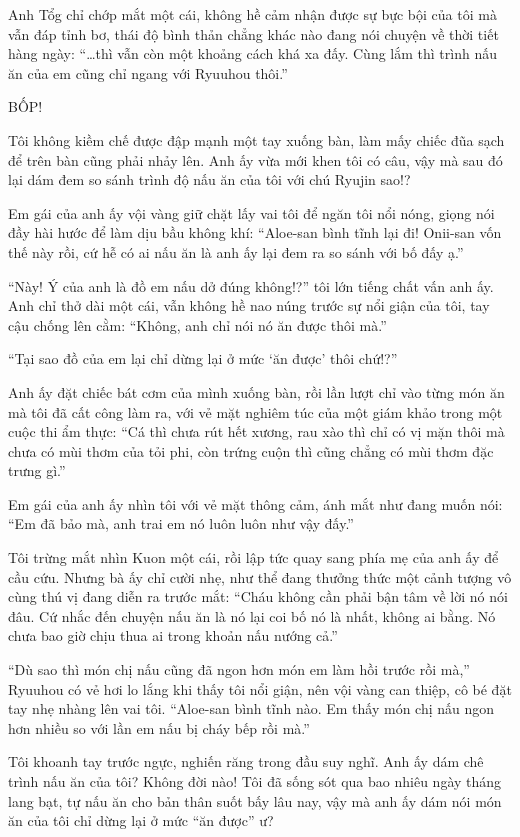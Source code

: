 \documentclass[../main.tex]{subfiles}
\begin{document}
Anh Tổg chỉ chớp mắt một cái, không hề cảm nhận được sự bực bội của tôi mà vẫn đáp tỉnh bơ, thái độ bình thản chẳng khác nào đang nói chuyện về thời tiết hàng ngày: ``\dots thì vẫn còn một khoảng cách khá xa đấy. Cùng lắm thì trình nấu ăn của em cũng chỉ ngang với Ryuuhou thôi.''

BỐP!

Tôi không kiềm chế được đập mạnh một tay xuống bàn, làm mấy chiếc đũa sạch để trên bàn cũng phải nhảy lên. Anh ấy vừa mới khen tôi có câu, vậy mà sau đó lại dám đem so sánh trình độ nấu ăn của tôi với chú Ryujin sao!?

Em gái của anh ấy vội vàng giữ chặt lấy vai tôi để ngăn tôi nổi nóng, giọng nói đầy hài hước để làm dịu bầu không khí: ``Aloe-san bình tĩnh lại đi! Onii-san vốn thế này rồi, cứ hễ có ai nấu ăn là anh ấy lại đem ra so sánh với bố đấy ạ.''

``Này! Ý của anh là đồ em nấu dở đúng không!?'' tôi lớn tiếng chất vấn anh ấy. Anh chỉ thở dài một cái, vẫn không hề nao núng trước sự nổi giận của tôi, tay cậu chống lên cằm: ``Không, anh chỉ nói nó ăn được thôi mà.''

``Tại sao đồ của em lại chỉ dừng lại ở mức `ăn được' thôi chứ!?''

Anh ấy đặt chiếc bát cơm của mình xuống bàn, rồi lần lượt chỉ vào từng món ăn mà tôi đã cất công làm ra, với vẻ mặt nghiêm túc của một giám khảo trong một cuộc thi ẩm thực: ``Cá thì chưa rút hết xương, rau xào thì chỉ có vị mặn thôi mà chưa có mùi thơm của tỏi phi, còn trứng cuộn thì cũng chẳng có mùi thơm đặc trưng gì.''

Em gái của anh ấy nhìn tôi với vẻ mặt thông cảm, ánh mắt như đang muốn nói: ``Em đã bảo mà, anh trai em nó luôn luôn như vậy đấy.''

Tôi trừng mắt nhìn Kuon một cái, rồi lập tức quay sang phía mẹ của anh ấy để cầu cứu. Nhưng bà ấy chỉ cười nhẹ, như thể đang thưởng thức một cảnh tượng vô cùng thú vị đang diễn ra trước mắt: ``Cháu không cần phải bận tâm về lời nó nói đâu. Cứ nhắc đến chuyện nấu ăn là nó lại coi bố nó là nhất, không ai bằng. Nó chưa bao giờ chịu thua ai trong khoản nấu nướng cả.''

``Dù sao thì món chị nấu cũng đã ngon hơn món em làm hồi trước rồi mà,'' Ryuuhou có vẻ hơi lo lắng khi thấy tôi nổi giận, nên vội vàng can thiệp, cô bé đặt tay nhẹ nhàng lên vai tôi. ``Aloe-san bình tĩnh nào. Em thấy món chị nấu ngon hơn nhiều so với lần em nấu bị cháy bếp rồi mà.''

Tôi khoanh tay trước ngực, nghiến răng trong đầu suy nghĩ. Anh ấy dám chê trình nấu ăn của tôi? Không đời nào! Tôi đã sống sót qua bao nhiêu ngày tháng lang bạt, tự nấu ăn cho bản thân suốt bấy lâu nay, vậy mà anh ấy dám nói món ăn của tôi chỉ dừng lại ở mức ``ăn được'' ư?
\end{document}
